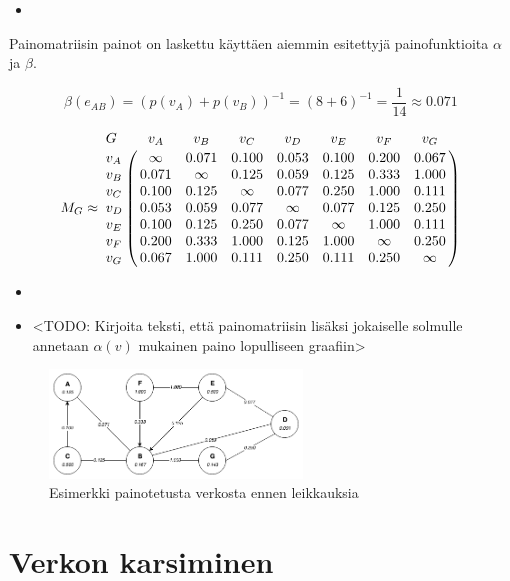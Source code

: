   \begin{itemize}
    \item <TODO: Kirjoita teksti esimerkkille painomatriisista, jota käytetään priorisoinnin syötteenä>
  \end{itemize}

  Painomatriisin painot on laskettu käyttäen aiemmin esitettyjä painofunktioita \(\alpha\) ja \(\beta\).

  \[\beta(e_{AB}) = (p(v_A) + p(v_B))^{-1} = (8 + 6)^{-1} = \frac{1}{14} \approx 0.071\]

  \[
    M_G \approx
    \bordermatrix{
      G & v_A & v_B & v_C & v_D & v_E & v_F & v_G \cr
      v_A & \infty & 0.071 & 0.100 & 0.053 & 0.100 & 0.200 & 0.067 \cr
      v_B & 0.071 & \infty & 0.125 & 0.059 & 0.125 & 0.333 & 1.000 \cr
      v_C & 0.100 & 0.125 & \infty & 0.077 & 0.250 & 1.000 & 0.111 \cr
      v_D & 0.053 & 0.059 & 0.077 & \infty & 0.077 & 0.125 & 0.250 \cr
      v_E & 0.100 & 0.125 & 0.250 & 0.077 & \infty & 1.000 & 0.111 \cr
      v_F & 0.200 & 0.333 & 1.000 & 0.125 & 1.000 & \infty & 0.250 \cr
      v_G & 0.067 & 1.000 & 0.111 & 0.250 & 0.111 & 0.250 & \infty \cr
    }
  \]

  \begin{itemize}
    \item <TODO: Kirjoita teksti esimerkille painotetusta verkosta, jota käytetään priorisoinnin syötteenä>
    \item <TODO: Kirjoita teksti, että painomatriisin lisäksi jokaiselle solmulle annetaan \(\alpha(v)\) mukainen paino lopulliseen graafiin>
  \end{itemize}

  \begin{figure}[H]
    \centering
    \includegraphics[width=0.6\textwidth]{assets/painotettu-verkko-ennen.png}
    \caption{Esimerkki painotetusta verkosta ennen leikkauksia}
    \label{fig:painotettu-verkko-ennen}
  \end{figure}

\section{Verkon karsiminen} \label{ch:10_verkon_karsiminen}

